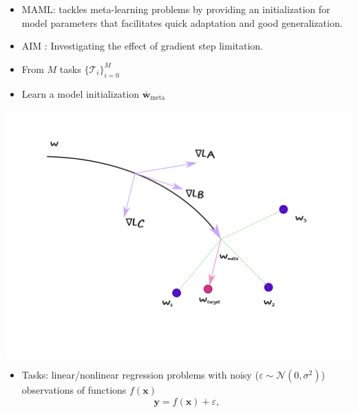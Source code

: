 \documentclass[a0paper,portrait]{baposter}
\begin{document}
\begin{poster}
{\begin{itemize}
    \color{Pink}\item \color{Black} MAML: tackles meta-learning problems by providing an initialization for model parameters that facilitates quick adaptation and good generalization.
  \color{Pink} \item AIM : \color{Black} Investigating the effect of gradient step limitation.
  \end{itemize}
  
}

{
  \begin{itemize}
    \color{Pink} \item \color{Black} From $M$ tasks $\{\mathcal{T}_i\}_{i=0}^{M}$
    \color{Pink} \item \color{Black} Learn a model initialization $\bar{\mathbf{w}}_{\text{meta}}$
  \end{itemize}
  \includegraphics[width=\textwidth]{figures/maml}
}

{
  \begin{itemize}
    \color{Pink} \item \color{Black} Tasks: linear/nonlinear regression problems with noisy ($\varepsilon  \sim \mathcal{N}(0, \sigma^2)$) observations of functions $f(\mathbf{x})$
      \begin{equation}\label{eq:task}
    \mathbf{y}= f(\mathbf{x})+\varepsilon, 
  \end{equation}  


\end{itemize}}
\end{poster}
\end{document}
